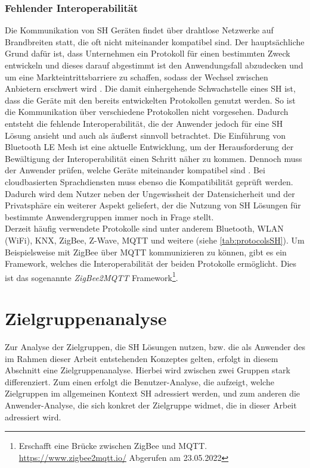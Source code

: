         \subsubsection*{Fehlender Interoperabilität}
            Die Kommunikation von \acl{SH} Geräten findet über drahtlose Netzwerke auf Brandbreiten statt, die oft nicht 
            miteinander kompatibel sind. Der hauptsächliche Grund dafür ist, dass Unternehmen ein Protokoll für einen 
            bestimmten Zweck entwickeln und dieses darauf abgestimmt ist den Anwendungsfall abzudecken und um eine 
            Markteintrittsbarriere zu schaffen, sodass der Wechsel zwischen Anbietern erschwert wird \cite{statista2021}. 
            Die damit einhergehende Schwachstelle eines \acl{SH} ist, dass die Geräte mit den bereits entwickelten 
            Protokollen genutzt werden. So ist die Kommunikation über verschiedene Protokollen nicht vorgesehen. Dadurch 
            entsteht die fehlende Interoperabilität, die der Anwender jedoch für eine \acl{SH} Lösung ansieht und auch 
            als äußerst sinnvoll betrachtet. Die Einführung von Bluetooth LE Mesh ist eine aktuelle Entwicklung, um der 
            Herausforderung der Bewältigung der Interoperabilität einen Schritt näher zu kommen. Dennoch muss der 
            Anwender prüfen, welche Geräte miteinander kompatibel sind \cite{statista2021}. Bei cloudbasierten 
            Sprachdiensten muss ebenso die Kompatibilität geprüft werden. 
            Dadurch wird dem Nutzer neben der Ungewissheit der Datensicherheit und der Privatsphäre ein weiterer Aspekt 
            geliefert, der die Nutzung von \acl{SH} Lösungen für bestimmte Anwendergruppen immer noch in Frage stellt.
            \\ 
            \linebreak
            Derzeit häufig verwendete Protokolle sind unter anderem Bluetooth, \ac{WLAN} (WiFi), KNX, ZigBee, Z-Wave, 
            MQTT und weitere (siehe \ref{tab:protocolsSH}). Um Beispielsweise mit ZigBee über \acs{MQTT} kommunizieren zu 
            können, gibt es ein Framework, welches die Interoperabilität der beiden Protokolle ermöglicht. Dies ist das 
            sogenannte \textit{ZigBee2MQTT} Framework\footnote{Erschafft eine Brücke zwischen ZigBee und MQTT. \url{https://www.zigbee2mqtt.io/} Abgerufen am 23.05.2022}.
\pagebreak
\section{Zielgruppenanalyse}
\label{sec:zielgruppenanalyse}
    Zur Analyse der Zielgruppen, die \acl{SH} Lösungen nutzen, bzw. die als Anwender des im Rahmen dieser Arbeit 
    entstehenden Konzeptes gelten, erfolgt in diesem Abschnitt eine Zielgruppenanalyse. Hierbei wird zwischen 
    zwei Gruppen stark differenziert. Zum einen erfolgt die Benutzer-Analyse, die aufzeigt, welche Zielgruppen 
    im allgemeinen Kontext \acl{SH} adressiert werden, und zum anderen die Anwender-Analyse, die sich 
    konkret der Zielgruppe widmet, die in dieser Arbeit adressiert wird. 

